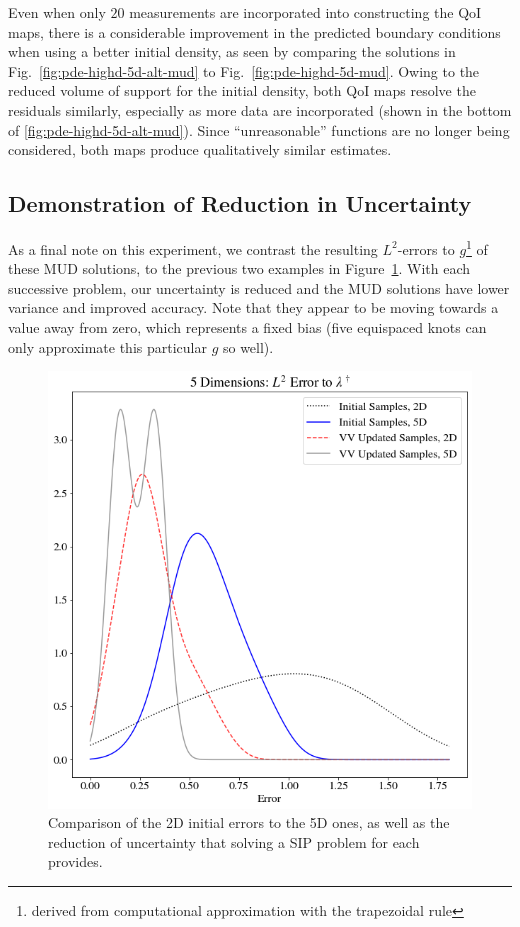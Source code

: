 Even when only $20$ measurements are incorporated into constructing the QoI maps, there is a considerable improvement in the predicted boundary conditions when using a better initial density, as seen by comparing the solutions in Fig.~\ref{fig:pde-highd-5d-alt-mud} to Fig.~\ref{fig:pde-highd-5d-mud}.
Owing to the reduced volume of support for the initial density, both QoI maps resolve the residuals similarly, especially as more data are incorporated (shown in the bottom of \ref{fig:pde-highd-5d-alt-mud}).
Since ``unreasonable'' functions are no longer being considered, both maps produce qualitatively similar estimates.

\subsection{Demonstration of Reduction in Uncertainty}
As a final note on this experiment, we contrast the resulting $L^2$-errors to $g$\footnote{derived from computational approximation with the trapezoidal rule} of these MUD solutions, to the previous two examples in Figure~\ref{fig:pde-highd-5d-hist}.
With each successive problem, our uncertainty is reduced and the MUD solutions have lower variance and improved accuracy.
Note that they appear to be moving towards a value away from zero, which represents a fixed bias (five equispaced knots can only approximate this particular $g$ so well).

\begin{figure}
\centering
  \includegraphics[width=0.675\linewidth]{figures/pde-highd/pde-highd_hist_D5_t5-0E-01}
\caption{
Comparison of the 2D initial errors to the 5D ones, as well as the reduction of uncertainty that solving a SIP problem for each provides.
}
\label{fig:pde-highd-5d-hist}
\end{figure}
